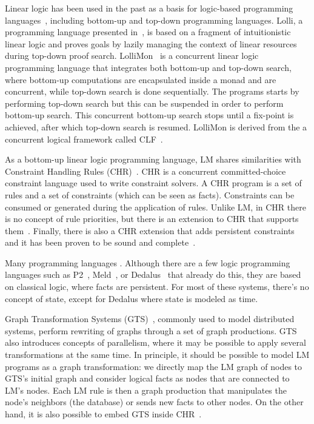 Linear logic has been used in the past as a basis for logic-based programming languages~\cite{Miller85anoverview}, including bottom-up and top-down programming languages. Lolli, a programming language presented in~\cite{Hodas94logicprogramming}, is based on a fragment of intuitionistic linear logic
and proves goals by lazily managing the context of linear resources during top-down proof search. LolliMon~\cite{Lopez:2005:MCL:1069774.1069778} is a concurrent linear logic programming language that integrates both bottom-up and top-down search, where bottom-up computations are encapsulated inside a monad and are concurrent, while top-down search is done sequentially. The programs starts by performing top-down search but this can be suspended in order to perform bottom-up search. This concurrent bottom-up search stops until a fix-point is achieved, after which top-down search is resumed. LolliMon is derived from the a concurrent logical framework called CLF~\cite{Watkins:2004uq,Cervesato02aconcurrent,Watkins03aconcurrent}.

As a bottom-up linear logic programming language, LM shares similarities with Constraint Handling Rules (CHR)~\cite{Betz:2005kx,Betz:2013:LBA:2422085.2422086}.
CHR is a concurrent committed-choice constraint language used to write constraint solvers. A CHR program is a set of rules and
a set of constraints (which can be seen as facts). Constraints can be consumed or generated during the application of rules.
Unlike LM, in CHR there is no
concept of rule priorities, but there is an extension to CHR that supports them~\cite{DeKoninck:2007:URP:1273920.1273924}.
Finally, there is also a CHR extension that adds persistent constraints and it has been proven to be sound and complete~\cite{DBLP:journals/corr/abs-1007-3829}.

Many programming languages . Although there are a few logic programming languages such as P2~\cite{Loo-condie-garofalakis-p2},
Meld~\cite{ashley-rollman-iclp09}, or Dedalus~\cite{Alvaro:EECS-2009-173} that already do this, they are based on classical logic, where facts are persistent. For most of these systems, there's no concept of state, except for Dedalus where state is modeled as time.

Graph Transformation Systems (GTS)~\cite{Ehrig:2004vn}, commonly used to model distributed systems, perform rewriting of graphs through
a set of graph productions. GTS also introduces
concepts of parallelism, where it may be possible to apply several transformations at the same time. In principle, it should be possible to model
LM programs as a graph transformation: we directly map the LM graph of nodes to GTS's initial graph and consider logical facts as nodes that are connected
to LM's nodes. Each LM rule is then a graph production that manipulates the node's neighbors (the database) or sends new facts to other nodes.
On the other hand, it is also possible to embed GTS inside CHR~\cite{Raiser:2011:AGT:1972935.1972938}.
